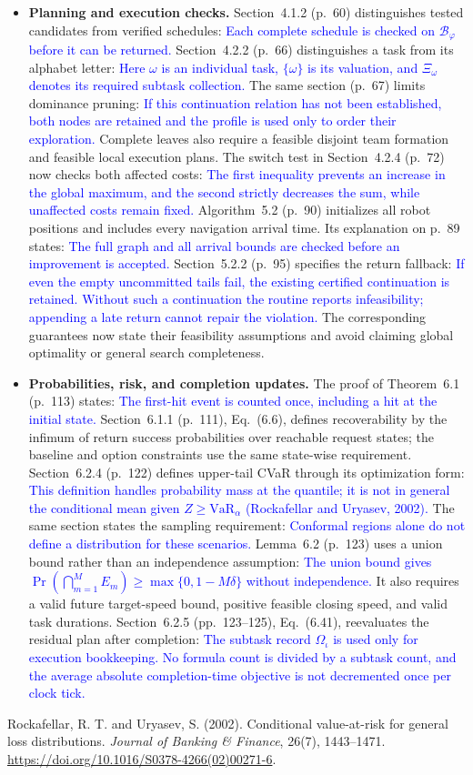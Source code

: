 \documentclass[11pt]{article}
\newcommand{\change}[1]{\textcolor{blue}{#1}}
\begin{document}
\begin{itemize}
\item \textbf{Planning and execution checks.}
Section~4.1.2 (p.~60) distinguishes tested candidates from verified schedules:
\change{Each complete schedule is checked on $\mathcal{B}_\varphi$ before it can
be returned.}
Section~4.2.2 (p.~66) distinguishes a task from its alphabet letter:
\change{Here $\omega$ is an individual task, $\{\omega\}$ is its valuation, and
$\Xi_\omega$ denotes its required subtask collection.}
The same section (p.~67) limits dominance pruning:
\change{If this continuation relation has not been established, both nodes are
retained and the profile is used only to order their exploration.}
Complete leaves also require a feasible disjoint team formation and feasible
local execution plans.
The switch test in Section~4.2.4 (p.~72) now checks both affected costs:
\change{The first inequality prevents an increase in the global maximum, and the
second strictly decreases the sum, while unaffected costs remain fixed.}
Algorithm~5.2 (p.~90) initializes all robot positions and includes every
navigation arrival time. Its explanation on p.~89 states:
\change{The full graph and all arrival bounds are checked before an improvement
is accepted.}
Section~5.2.2 (p.~95) specifies the return fallback:
\change{If even the empty uncommitted tails fail, the existing
certified continuation is retained. Without such a continuation the routine
reports infeasibility; appending a late return cannot repair the violation.}
The corresponding guarantees now state their feasibility assumptions and
avoid claiming global optimality or general search completeness.

\item \textbf{Probabilities, risk, and completion updates.}
The proof of Theorem~6.1 (p.~113) states:
\change{The first-hit event is counted once, including a hit at the initial state.}
Section~6.1.1 (p.~111), Eq.~(6.6), defines recoverability by the infimum of
return success probabilities over reachable request states; the baseline and
option constraints use the same state-wise requirement.
Section~6.2.4 (p.~122) defines upper-tail CVaR through its optimization form:
\change{This definition handles probability mass at the quantile; it is not in
general the conditional mean given $Z\ge\mathrm{VaR}_\alpha$
(Rockafellar and Uryasev, 2002).}
The same section states the sampling requirement:
\change{Conformal regions alone do not define a distribution for these scenarios.}
Lemma~6.2 (p.~123) uses a union bound rather than an independence assumption:
\change{The union bound gives
$\Pr(\bigcap_{m=1}^M E_m)\ge\max\{0,1-M\delta\}$ without independence.}
It also requires a valid future target-speed bound, positive feasible closing
speed, and valid task durations.
Section~6.2.5 (pp.~123--125), Eq.~(6.41), reevaluates the residual plan after completion:
\change{The subtask record $\Omega_\iota$ is used only for execution bookkeeping.
No formula count is divided by a subtask count, and the average absolute
completion-time objective is not decremented once per clock tick.}
\end{itemize}

\noindent Rockafellar, R. T. and Uryasev, S. (2002).
Conditional value-at-risk for general loss distributions.
\emph{Journal of Banking \& Finance}, 26(7), 1443--1471.
\url{https://doi.org/10.1016/S0378-4266(02)00271-6}.
\end{document}
